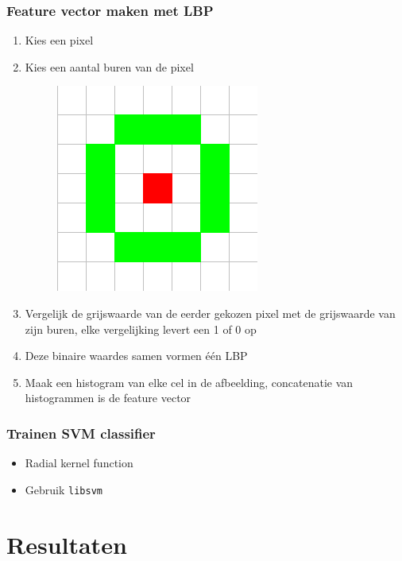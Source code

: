 \documentclass{beamer}
\begin{document}
    \begin{frame}
        \frametitle{Feature vector maken met LBP}

        \begin{enumerate}
            \item Kies een pixel
            \pause
            \item Kies een aantal buren van de pixel
            \begin{figure}
                \includegraphics[scale=.3]{12-5neighbourhood.png}
            \end{figure}
            \pause
            \item Vergelijk de grijswaarde van de eerder gekozen pixel met de
            grijswaarde van zijn buren, elke vergelijking levert een 1 of 0 op
            \pause
            \item Deze binaire waardes samen vormen \'e\'en LBP
            \pause
            \item Maak een histogram van elke cel in de afbeelding,
            concatenatie van histogrammen is de feature vector
        \end{enumerate}
    \end{frame}

    \begin{frame}
        \frametitle{Trainen SVM classifier}

        \begin{itemize}
            \item Radial kernel function
            \item Gebruik \texttt{libsvm}
        \end{itemize}
    \end{frame}

    \section{Resultaten}
\end{document}
